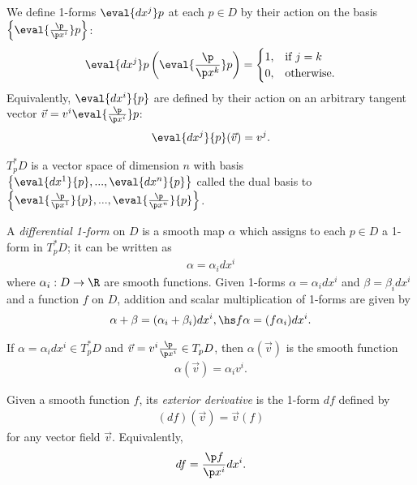 \documentclass{article}
\begin{document}
\begin{definition}
	We define 1-forms $\eval{dx^j}p$ at each $p\in D$ by their action on the basis
	$\left\lbrace\eval{\frac{\p }{\p x^i}}p\right\rbrace$:
	\begin{align*}
		\eval{dx^j}p\left(\eval{\frac{\p }{\p x^k}}p\right)= \begin{cases}
			1, & \text{if } j = k  \\
			0, & \text{otherwise}.
		\end{cases}
	\end{align*}
	Equivalently, $\eval{dx^i}{p}$ are defined by their action on an arbitrary tangent vector
	$\vec v = v^i\eval{\frac{\p }{\p x^i}}p$:
	\begin{align*}
		\eval{dx^j}{p}(\vec v) = v^j.
	\end{align*}
\end{definition}

\begin{lemma}
	$T_p^*D$ is a vector space of dimension $n$ with basis
	$\left\lbrace \eval{dx^1}{p},...,\eval{dx^n}{p}\right\rbrace$ called the dual basis to
	$\left\lbrace \eval{\frac{\p }{\p x^1}}{p}, ..., \eval{\frac{\p }{\p x^n}}{p}\right\rbrace$.
\end{lemma}

\begin{definition}
	A \emph{differential 1-form} on $D$ is a smooth map $\alpha$ which assigns to each $p\in D$
	a 1-form in $T^*_pD$; it can be written as
	\begin{align*}
		\alpha = \alpha_i dx^i
	\end{align*}
	where $\alpha_i:D\to\R$ are smooth functions. Given 1-forms $\alpha=\alpha_idx^i$ and
	$\beta=\beta_idx^i$ and a function $f$ on $D$, addition and scalar multiplication of
	1-forms are given by
	\begin{align*}
		\alpha + \beta = (\alpha_i + \beta_i)dx^i,\hs f\alpha = (f\alpha_i)dx^i.
	\end{align*}
\end{definition}

\begin{lemma}[Notes 4.16]
	If $\alpha=\alpha_i dx^i\in T_p^*D$ and $\vec v=v^i\frac{\p }{\p x^i}\in T_pD$,
	then $\alpha(\vec v)$ is the smooth function
	\begin{align*}
		\alpha(\vec v) = \alpha_i v^i.
	\end{align*}
\end{lemma}

\begin{definition}
	Given a smooth function $f$, its \emph{exterior derivative} is the 1-form
	$df$ defined by
	\begin{align*}
		(df)(\vec v) = \vec v(f)
	\end{align*}
	for any vector field $\vec v$. Equivalently,
	\begin{align*}
		df=\frac{\p f}{\p x^i}dx^i.
	\end{align*}
\end{definition}
\end{document}
